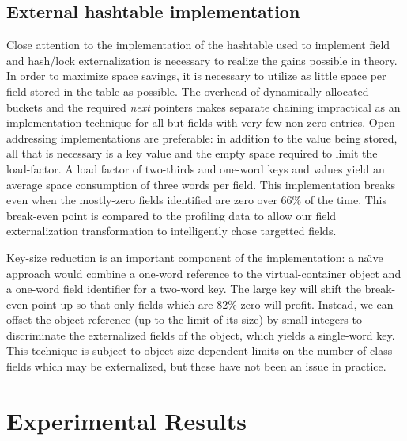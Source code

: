 \documentclass{acmconf}
\begin{document}


\subsection{External hashtable implementation}
\label{sec:extern-impl}
Close attention to the implementation of the hashtable used to
implement field and hash/lock externalization is
necessary to realize the gains possible in theory.  In order to
maximize space savings, it is necessary to utilize as little space
per field stored in the table as possible.  The overhead of
dynamically allocated buckets and the required {\it next} pointers
makes separate chaining impractical as an implementation technique
for all but fields with very few non-zero entries.  Open-addressing
implementations are preferable: in addition to the value being stored,
all that is necessary is a key value and the empty space required to
limit the load-factor.  A load factor of two-thirds and one-word keys
and values yield an average space consumption of three words per
field.  This implementation breaks even when the mostly-zero fields
identified are zero over 66\% of the time.  This break-even point is
compared to the profiling data to allow our field externalization
transformation to intelligently chose targetted fields.

Key-size reduction is an important component of the implementation:
a na{\"\i}ve approach
would combine a one-word reference to the virtual-container object and a
one-word field identifier for a two-word key.  The large key will
shift the break-even point up so that only fields which are 82\% zero
will profit.  Instead, we can offset the
object reference (up to the limit of its size) by small integers
to discriminate the externalized fields of the object, which yields
a single-word key.  This technique is
subject to object-size-dependent limits on the number
of class fields which may be externalized, but these have not been an
issue in practice.

\section{Experimental Results}
\label{sec:results}
\end{document}
